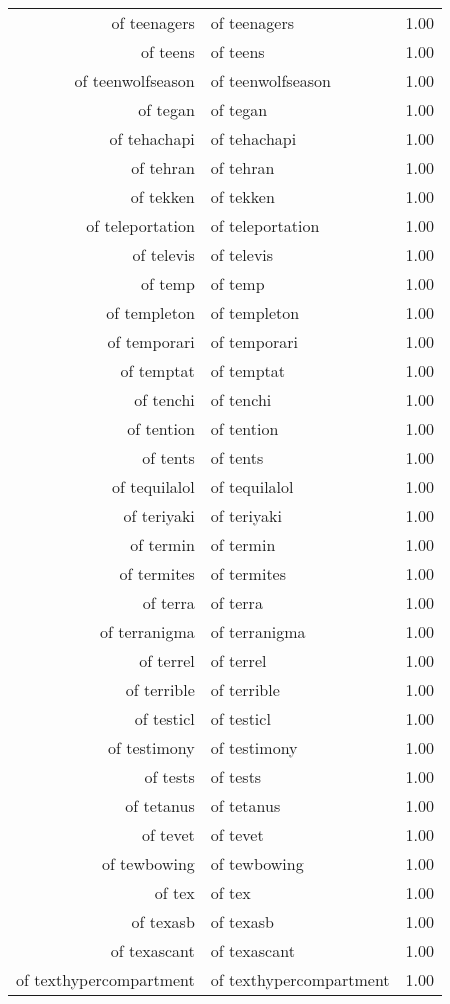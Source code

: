 \begin{table}[ht]
\begin{tabular}{rlr}
  of teenagers & of teenagers & 1.00 \\ 
  of teens & of teens & 1.00 \\ 
  of teenwolfseason & of teenwolfseason & 1.00 \\ 
  of tegan & of tegan & 1.00 \\ 
  of tehachapi & of tehachapi & 1.00 \\ 
  of tehran & of tehran & 1.00 \\ 
  of tekken & of tekken & 1.00 \\ 
  of teleportation & of teleportation & 1.00 \\ 
  of televis & of televis & 1.00 \\ 
  of temp & of temp & 1.00 \\ 
  of templeton & of templeton & 1.00 \\ 
  of temporari & of temporari & 1.00 \\ 
  of temptat & of temptat & 1.00 \\ 
  of tenchi & of tenchi & 1.00 \\ 
  of tention & of tention & 1.00 \\ 
  of tents & of tents & 1.00 \\ 
  of tequilalol & of tequilalol & 1.00 \\ 
  of teriyaki & of teriyaki & 1.00 \\ 
  of termin & of termin & 1.00 \\ 
  of termites & of termites & 1.00 \\ 
  of terra & of terra & 1.00 \\ 
  of terranigma & of terranigma & 1.00 \\ 
  of terrel & of terrel & 1.00 \\ 
  of terrible & of terrible & 1.00 \\ 
  of testicl & of testicl & 1.00 \\ 
  of testimony & of testimony & 1.00 \\ 
  of tests & of tests & 1.00 \\ 
  of tetanus & of tetanus & 1.00 \\ 
  of tevet & of tevet & 1.00 \\ 
  of tewbowing & of tewbowing & 1.00 \\ 
  of tex & of tex & 1.00 \\ 
  of texasb & of texasb & 1.00 \\ 
  of texascant & of texascant & 1.00 \\ 
  of texthypercompartment & of texthypercompartment & 1.00 \\ 

\end{tabular}
\end{table}
